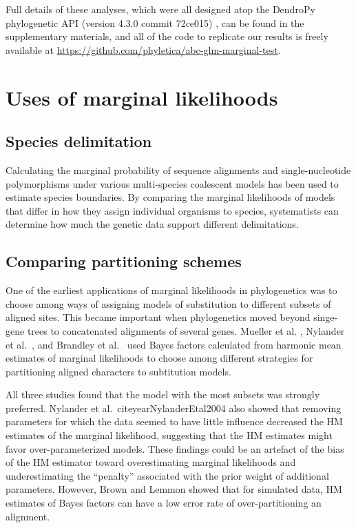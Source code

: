 Full details of these analyses, which were all designed atop the DendroPy
phylogenetic API (version 4.3.0 commit 72ce015) \citep{Sukumaran2010}, can be
found in the supplementary materials, and all of the code to replicate our
results is freely available at
\href{https://github.com/phyletica/abc-glm-marginal-test}{https://github.com/phyletica/abc-glm-marginal-test}.


\section{Uses of marginal likelihoods}


\subsection{Species delimitation}
Calculating the marginal probability of sequence alignments \citep{Grummer2013}
and single-nucleotide polymorphisms \citep{Leache2014}
under various multi-species coalescent models has been used
to estimate species boundaries.
By comparing the marginal likelihoods of models that differ in how they assign
individual organisms to species, systematists can determine how much the
genetic data support different delimitations.

\subsection{Comparing partitioning schemes}

One of the earliest applications of marginal likelihoods in phylogenetics was
to choose among ways of assigning models of substitution to different subsets
of aligned sites.
This became important when phylogenetics moved beyond singe-gene trees to
concatenated alignments of several genes.
Mueller et al. \citeyear{Mueller2004},
Nylander et al.\ \citeyear{NylanderEtal2004}, and
Brandley et al.\ \citeyear{Brandley2005}
used Bayes factors calculated from harmonic mean
estimates of marginal likelihoods to choose among different strategies for
partitioning aligned characters to subtitution models.

All three studies found that the model with the most subsets was strongly
preferred.
Nylander et al.\ citeyear{NylanderEtal2004} also showed that removing
parameters for which the data seemed to have little influence decreased the HM
estimates of the marginal likelihood, suggesting that the HM estimates might
favor over-parameterized models.
These findings could be an artefact of the bias of the HM estimator toward
overestimating marginal likelihoods and underestimating the ``penalty''
associated with the prior weight of additional parameters.
However, Brown and Lemmon \citeyear{Brown2007} showed that for simulated data,
HM estimates of Bayes factors can have a low error rate of over-partitioning an
alignment.

